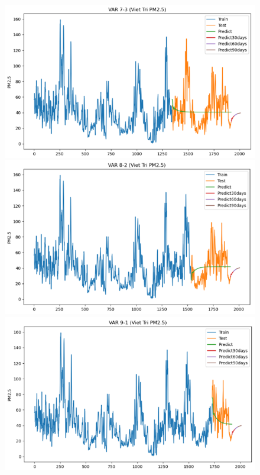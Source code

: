 \begin{figure}[H]
{\begin{adjustbox}{minipage=0.48\textwidth}
\begin{minipage}{0.3\textwidth}
            \end{minipage}\hfill
            \begin{minipage}{0.3\textwidth}
                \centering
                \includegraphics[width=\textwidth]{img/final/VAR/90D/VAR_7_3_VT.png}\\
                \includegraphics[width=\textwidth]{img/final/VAR/90D/VAR_8_2_VT.png}\\
                \includegraphics[width=\textwidth]{img/final/VAR/90D/VAR_9_1_VT.png}

\end{minipage}
\end{adjustbox}}
\end{figure}
